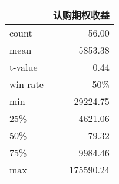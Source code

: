 \begin{tabular}{lr}
\toprule
{} &    认购期权收益 \\
\midrule
count &     56.00 \\
mean  &   5853.38 \\
t-value   &  0.44 \\
win-rate & 50\% \\
min   & -29224.75 \\
25\%   &  -4621.06 \\
50\%   &     79.32 \\
75\%   &   9984.46 \\
max   & 175590.24 \\
\bottomrule
\end{tabular}
